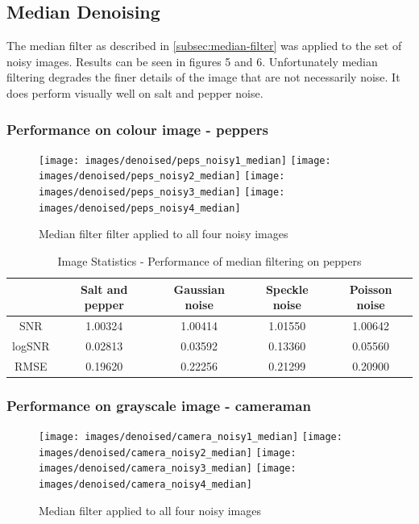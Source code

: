 \documentclass{article}
\begin{document}
\subsection{Median Denoising}
\label{subsec:median-denoise}
The median filter as described in \ref{subsec:median-filter} was applied to the set of
noisy images. Results can be seen in figures 5 and 6. Unfortunately
median filtering degrades the finer details of the image that are not
necessarily noise. It does perform visually well on salt and pepper noise.
\subsubsection{Performance on colour image - peppers}
\begin{figure}[H]
  \centering
  \texttt{[image: images/denoised/peps\_noisy1\_median]}
  \texttt{[image: images/denoised/peps\_noisy2\_median]}
  \texttt{[image: images/denoised/peps\_noisy3\_median]}
  \texttt{[image: images/denoised/peps\_noisy4\_median]}
  \caption{Median filter filter applied to all four noisy images }
\end{figure}
\begin{table}[H]
  \centering
  \begin{tabular}{c|c|c|c|c}
    & Salt and pepper & Gaussian noise & Speckle noise & Poisson noise \\
    \hline
    SNR & 1.00324 & 1.00414 & 1.01550 & 1.00642 \\
    logSNR & 0.02813 & 0.03592 & 0.13360 & 0.05560 \\
    RMSE & 0.19620 & 0.22256 & 0.21299 & 0.20900 \\
  \end{tabular}
  \caption{Image Statistics - Performance of median filtering on peppers }
\end{table}

\subsubsection{Performance on grayscale image - cameraman}
\begin{figure}[H]
  \centering
  \texttt{[image: images/denoised/camera\_noisy1\_median]}
  \texttt{[image: images/denoised/camera\_noisy2\_median]}
  \texttt{[image: images/denoised/camera\_noisy3\_median]}
  \texttt{[image: images/denoised/camera\_noisy4\_median]}
  \caption{Median filter applied to all four noisy images }
\end{figure}
\end{document}
